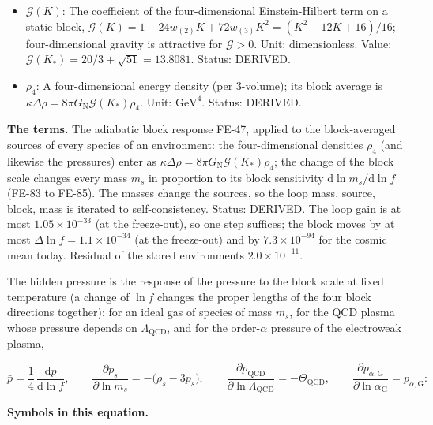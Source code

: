 \documentclass[
  10pt,
]{article}
\begin{document}
\begin{itemize}
  (\(M_{\mathrm{Pl}} = G_{\mathrm{N}}^{-1/2} = 1.22091\times10^{19}\)
  GeV). Status: STANDARD.
\item
  \(\mathcal{G}(K)\): The coefficient of the four-dimensional
  Einstein-Hilbert term on a static block,
  \(\mathcal{G}(K) = 1 - 24w_{(2)}K + 72w_{(3)}K^2 = (K^2 - 12K + 16)/16\);
  four-dimensional gravity is attractive for \(\mathcal{G} > 0\). Unit:
  dimensionless. Value:
  \(\mathcal{G}(K_*) = 20/3 + \sqrt{51} = 13.8081\). Status: DERIVED.
\item
  \(\rho_4\): A four-dimensional energy density (per 3-volume); its
  block average is
  \(\kappa\Delta\rho = 8\pi G_{\mathrm{N}}\mathcal{G}(K_*)\rho_4\).
  Unit: \(\mathrm{GeV}^{4}\). Status: DERIVED.
\end{itemize}

\textbf{The terms.} The adiabatic block response FE-47, applied to the
block-averaged sources of every species of an environment: the
four-dimensional densities \(\rho_4\) (and likewise the pressures) enter
as \(\kappa\Delta\rho = 8\pi G_{\mathrm{N}}\mathcal{G}(K_*)\rho_4\); the
change of the block scale changes every mass \(m_s\) in proportion to
its block sensitivity \(\mathrm{d}\ln m_s/\mathrm{d}\ln f\) (FE-83 to
FE-85). The masses change the sources, so the loop mass, source, block,
mass is iterated to self-consistency. Status: DERIVED. The loop gain is
at most \(1.05\times10^{-33}\) (at the freeze-out), so one step
suffices; the block moves by at most \(\Delta\ln f = 1.1\times10^{-34}\)
(at the freeze-out) and by \(7.3\times10^{-94}\) for the cosmic mean
today. Residual of the stored environments \(2.0\times10^{-11}\).

The hidden pressure is the response of the pressure to the block scale
at fixed temperature (a change of \(\ln f\) changes the proper lengths
of the four block directions together): for an ideal gas of species of
mass \(m_s\), for the QCD plasma whose pressure depends on
\(\Lambda_{\mathrm{QCD}}\), and for the order-\(\alpha\) pressure of the
electroweak plasma,

\[
\bar p = \frac14\,\frac{\mathrm{d}p}{\mathrm{d}\ln f},\qquad \frac{\partial p_s}{\partial\ln m_s} = -\big(\rho_s - 3p_s\big),\qquad
\frac{\partial p_{\mathrm{QCD}}}{\partial\ln\Lambda_{\mathrm{QCD}}} = -\Theta_{\mathrm{QCD}},\qquad
\frac{\partial p_{\alpha,\mathrm{G}}}{\partial\ln\alpha_{\mathrm{G}}} = p_{\alpha,\mathrm{G}}:
\]

\textbf{Symbols in this equation.}
\end{document}
